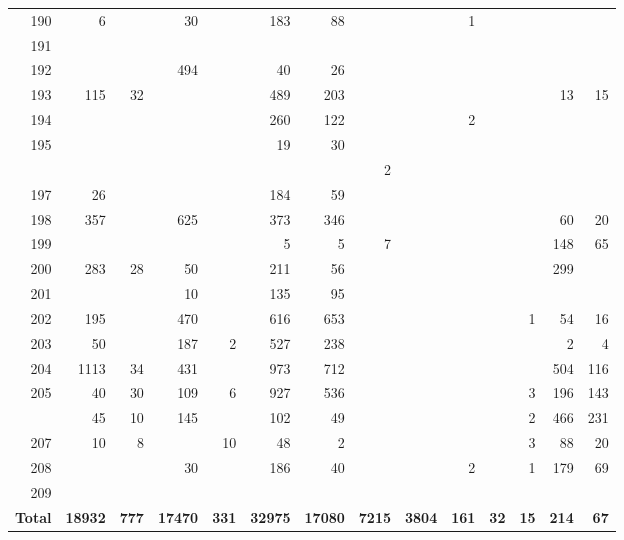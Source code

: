 \documentclass[
]{article}
\begin{document}
\begin{longtable}[l]{rrrrrrrrrrrrrr}
190 & 6 &  & 30 &  & 183 & 88 &  &  & 1 &  &  &  & \\
\addlinespace
\rowcolor{lightgray}  191 &  &  &  &  &  &  &  &  &  &  &  &  & \\
192 &  &  & 494 &  & 40 & 26 &  &  &  &  &  &  & \\
\rowcolor{lightgray}  193 & 115 & 32 &  &  & 489 & 203 &  &  &  &  &  & 13 & 15\\
194 &  &  &  &  & 260 & 122 &  &  & 2 &  &  &  & \\
\rowcolor{lightgray}  195 &  &  &  &  & 19 & 30 &  &  &  &  &  &  & \\
\addlinespace
196 &  &  &  &  &  &  & 2 &  &  &  &  &  & \\
\rowcolor{lightgray}  197 & 26 &  &  &  & 184 & 59 &  &  &  &  &  &  & \\
198 & 357 &  & 625 &  & 373 & 346 &  &  &  &  &  & 60 & 20\\
\rowcolor{lightgray}  199 &  &  &  &  & 5 & 5 & 7 &  &  &  &  & 148 & 65\\
200 & 283 & 28 & 50 &  & 211 & 56 &  &  &  &  &  & 299 & \\
\addlinespace
\rowcolor{lightgray}  201 &  &  & 10 &  & 135 & 95 &  &  &  &  &  &  & \\
202 & 195 &  & 470 &  & 616 & 653 &  &  &  &  & 1 & 54 & 16\\
\rowcolor{lightgray}  203 & 50 &  & 187 & 2 & 527 & 238 &  &  &  &  &  & 2 & 4\\
204 & 1113 & 34 & 431 &  & 973 & 712 &  &  &  &  &  & 504 & 116\\
\rowcolor{lightgray}  205 & 40 & 30 & 109 & 6 & 927 & 536 &  &  &  &  & 3 & 196 & 143\\
\addlinespace
206 & 45 & 10 & 145 &  & 102 & 49 &  &  &  &  & 2 & 466 & 231\\
\rowcolor{lightgray}  207 & 10 & 8 &  & 10 & 48 & 2 &  &  &  &  & 3 & 88 & 20\\
208 &  &  & 30 &  & 186 & 40 &  &  & 2 &  & 1 & 179 & 69\\
\rowcolor{lightgray}  209 &  &  &  &  &  &  &  &  &  &  &  &  & \\
\rowcolor{cyan}  \textbf{Total} & \textbf{18932} & \textbf{777} & \textbf{17470} & \textbf{331} & \textbf{32975} & \textbf{17080} & \textbf{7215} & \textbf{3804} & \textbf{161} & \textbf{32} & \textbf{15} & \textbf{214} & \textbf{67}\\*
\end{longtable}
\endgroup{}
\end{document}
